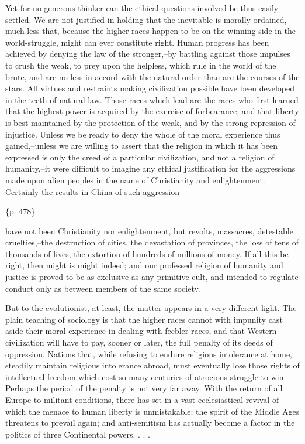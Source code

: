 Yet for no generous thinker can the ethical questions involved be thus easily settled. We are not justified in holding that the inevitable is morally ordained,--much less that, because the higher races happen to be on the winning side in the world-struggle, might can ever constitute right. Human progress has been achieved by denying the law of the stronger,--by battling against those impulses to crush the weak, to prey upon the helpless, which rule in the world of the brute, and are no less in accord with the natural order than are the courses of the stars. All virtues and restraints making civilization possible have been developed in the teeth of natural law. Those races which lead are the races who first learned that the highest power is acquired by the exercise of forbearance, and that liberty is best maintained by the protection of the weak, and by the strong repression of injustice. Unless we be ready to deny the whole of the moral experience thus gained,--unless we are willing to assert that the religion in which it has been expressed is only the creed of a particular civilization, and not a religion of humanity,--it were difficult to imagine any ethical justification for the aggressions made upon alien peoples in the name of Christianity and enlightenment. Certainly the results in China of such aggression

\{p. 478\}

have not been Christianity nor enlightenment, but revolts, massacres, detestable cruelties,--the destruction of cities, the devastation of provinces, the loss of tens of thousands of lives, the extortion of hundreds of millions of money. If all this be right, then might is might indeed; and our professed religion of humanity and justice is proved to be as exclusive as any primitive cult, and intended to regulate conduct only as between members of the same society.

But to the evolutionist, at least, the matter appears in a very different light. The plain teaching of sociology is that the higher races cannot with impunity cast aside their moral experience in dealing with feebler races, and that Western civilization will have to pay, sooner or later, the full penalty of its deeds of oppression. Nations that, while refusing to endure religious intolerance at home, steadily maintain religious intolerance abroad, must eventually lose those rights of intellectual freedom which cost so many centuries of atrocious struggle to win. Perhaps the period of the penalty is not very far away. With the return of all Europe to militant conditions, there has set in a vast ecclesiastical revival of which the menace to human liberty is unmistakable; the spirit of the Middle Ages threatens to prevail again; and anti-semitism has actually become a factor in the politics of three Continental powers. . . .

